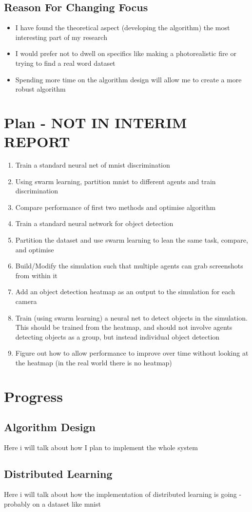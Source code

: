 \documentclass[10pt,a4paper,titlepage]{report}
\begin{document}
	\subsection{Reason For Changing Focus}
	\begin{itemize}
		\item I have found the theoretical aspect (developing the algorithm) the most interesting part of my research
		\item I would prefer not to dwell on specifics like making a photorealistic fire or trying to find a real word dataset
		\item Spending more time on the algorithm design will allow me to create a more robust algorithm
	\end{itemize}
	
	\section{Plan - NOT IN INTERIM REPORT}
	\begin{enumerate}
		\item Train a standard neural net of mnist discrimination
		\item Using swarm learning, partition mnist to different agents and train discrimination
		\item Compare performance of first two methods and optimise algorithm
		\item Train a standard neural network for object detection
		\item Partition the dataset and use swarm learning to lean the same task, compare, and optimise
		\item Build/Modify the simulation such that multiple agents can grab screenshots from within it
		\item Add an object detection heatmap as an output to the simulation for each camera
		\item Train (using swarm learning) a neural net to detect objects in the simulation. This should be trained from the heatmap, and should not involve agents detecting objects as a group, but instead individual object detection
		\item Figure out how to allow performance to improve over time without looking at the heatmap (in the real world there is no heatmap)
	\end{enumerate}
	
	\section{Progress}
	\subsection{Algorithm Design}
	Here i will talk about how I plan to implement the whole system
	\subsection{Distributed Learning}
	Here i will talk about how the implementation of distributed learning is going - probably on a dataset like mnist
\end{document}
